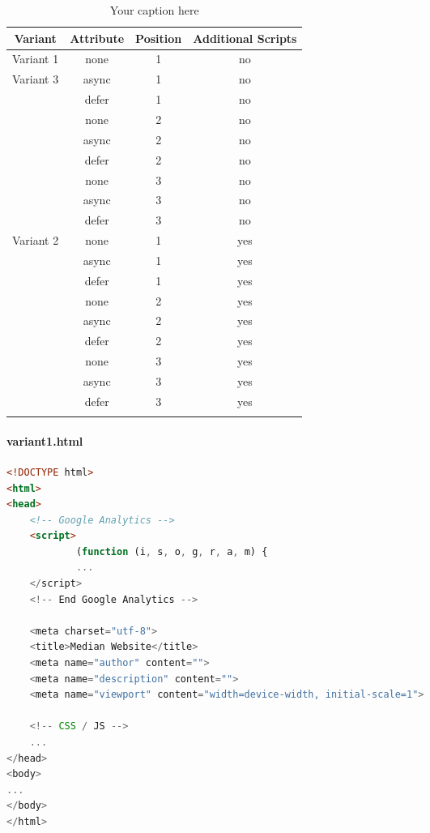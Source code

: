 \begin{center}
	\begin{longtable}{ |c|c|c|c|  }
	\hline
	Variant & Attribute & Position & Additional Scripts \\
	  \hline
	  \rowcolor{lightgrey}
	   Variant 1 & none & 1 & no \\
	  \rowcolor{lightgrey}
	  Variant 3 & async & 1 & no \\
	   & defer & 1 & no \\
	   
  	   & none & 2 & no \\
	   & async & 2 & no \\
  	   & defer & 2 & no \\

  	   & none & 3 & no \\
	   & async & 3 & no \\
  	   & defer & 3 & no \\
  	   
	  \rowcolor{lightgrey}
	   Variant 2 & none & 1 & yes \\
	   & async & 1 & yes \\
  	   & defer & 1 & yes \\

  	   & none & 2 & yes \\
	   & async & 2 & yes \\
  	   & defer & 2 & yes \\

  	   & none & 3 & yes \\
	   & async & 3 & yes \\
  	   & defer & 3 & yes \\
	  \hline
	\caption{Your caption here} %
	\label{tab:myfirstlongtable}
	\end{longtable}
\end{center}

\paragraph{variant1.html}


\begin{center}
\begin{lstlisting}[caption={Variant 1},label=lst:soap,language=html,label={lst:soap}]
<!DOCTYPE html>
<html>
<head>
    <!-- Google Analytics -->
    <script>
            (function (i, s, o, g, r, a, m) {
            ...
    </script>
    <!-- End Google Analytics -->

    <meta charset="utf-8">
    <title>Median Website</title>
    <meta name="author" content="">
    <meta name="description" content="">
    <meta name="viewport" content="width=device-width, initial-scale=1">

    <!-- CSS / JS -->
    ...
</head>
<body>
...
</body>
</html>
\end{lstlisting}
\end{center}


